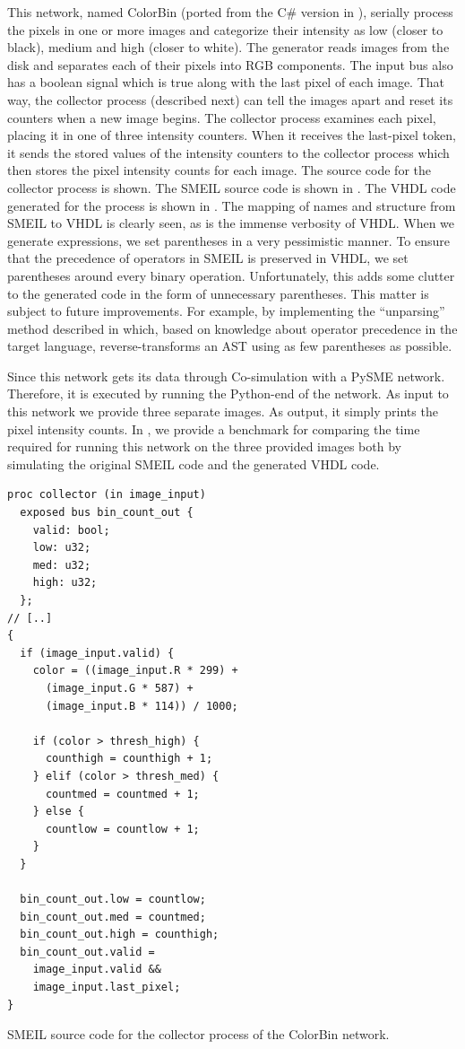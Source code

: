 This network, named ColorBin (ported from the C\# version in
\cite{skovhede2017c++}), serially process the pixels in one or more images and
categorize their intensity as low (closer to black), medium and high (closer to
white). The generator reads images from the disk and separates each of their
pixels into RGB components. The input bus also has a boolean signal which is
true along with the last pixel of each image. That way, the collector process
(described next) can tell the images apart and reset its counters when a new
image begins. The collector process examines each pixel, placing it in one of
three intensity counters. When it receives the last-pixel token, it sends the
stored values of the intensity counters to the collector process which then
stores the pixel intensity counts for each image. The source code for the
collector process is shown. The SMEIL source code is shown in
. The VHDL code generated for the process is shown in
. The mapping of names and structure from SMEIL to VHDL is
clearly seen, as is the immense verbosity of VHDL. When we generate expressions,
we set parentheses in a very pessimistic manner. To ensure that the precedence
of operators in SMEIL is preserved in VHDL, we set parentheses around every
binary operation. Unfortunately, this adds some clutter to the generated code in
the form of unnecessary parentheses. This matter is subject to future
improvements. For example, by implementing the ``unparsing'' method described in
\cite{ramsey1998unparsing} which, based on knowledge about operator precedence
in the target language, reverse-transforms an AST using as few parentheses as
possible.

Since this network gets its data through Co-simulation with a PySME
network. Therefore, it is executed by running the Python-end of the network. As
input to this network we provide three separate images. As output, it simply
prints the pixel intensity counts. In , we provide a benchmark
for comparing the time required for running this network on the three provided
images both by simulating the original SMEIL code and the generated VHDL code.

\begin{widefigure}

\begin{lstlisting}[language=smeil,multicols=2]
proc collector (in image_input)
  exposed bus bin_count_out {
    valid: bool;
    low: u32;
    med: u32;
    high: u32;
  };
// [..]
{
  if (image_input.valid) {
    color = ((image_input.R * 299) +
      (image_input.G * 587) +
      (image_input.B * 114)) / 1000;

    if (color > thresh_high) {
      counthigh = counthigh + 1;
    } elif (color > thresh_med) {
      countmed = countmed + 1;
    } else {
      countlow = countlow + 1;
    }
  }

  bin_count_out.low = countlow;
  bin_count_out.med = countmed;
  bin_count_out.high = counthigh;
  bin_count_out.valid =
    image_input.valid &&
    image_input.last_pixel;
}
\end{lstlisting}
  \caption{SMEIL source code for the collector process of the ColorBin network.}
  \label{fig:collector}
\end{widefigure}

